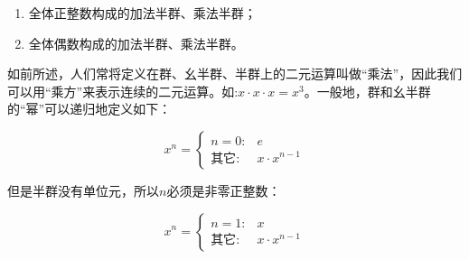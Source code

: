 \documentclass[b5paper]{ctexart}
\begin{document}
\begin{enumerate}
\item 全体正整数构成的加法半群、乘法半群；
\item 全体偶数构成的加法半群、乘法半群。
\end{enumerate}

如前所述，人们常将定义在群、幺半群、半群上的二元运算叫做“乘法”，因此我们可以用“乘方”来表示连续的二元运算。如:$x \cdot x \cdot x = x^3$。一般地，群和幺半群的“幂”可以递归地定义如下：

\[
x^n = \left .
  \begin{cases}
  n = 0 : & e \\
  \text{其它}: & x \cdot x^{n-1}
  \end{cases}
\right .
\]

但是半群没有单位元，所以$n$必须是非零正整数：

\[
x^n = \left .
  \begin{cases}
  n = 1 : & x \\
  \text{其它}: & x \cdot x^{n-1}
  \end{cases}
\right .
\]
\end{document}
